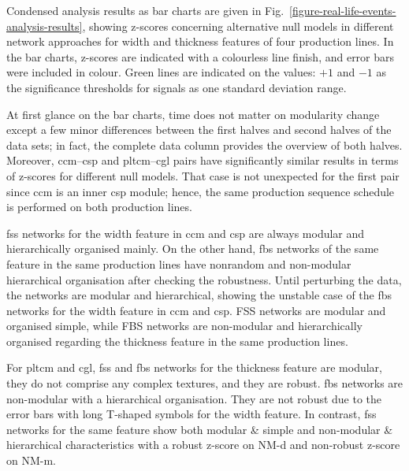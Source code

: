 Condensed analysis results as bar charts are given in Fig.~\ref{figure-real-life-events-analysis-results}, showing z-scores concerning alternative null models in different network approaches for width and thickness features of four production lines. In the bar charts, z-scores are indicated with a colourless line finish, and error bars were included in colour. Green lines are indicated on the values: $+1$ and $-1$ as the significance thresholds for signals as one standard deviation range.
\renewcommand{\aa}{Analysis Bar Chart Results:}


\newcommand{\bb}{Modularity Values and Z-scores in Different Network Resolutions}
\newcommand{\cc}{Analysis Curve Plot Results:}
\newcommand{\dd}{Modularity Values and Z-scores in Sliding-time Windows \& Different Network Resolutions}
\newcommand{\ee}{Modularity Values and Z-scores in Discrete-time Windows}

At first glance on the bar charts, time does not matter on modularity change except a few minor differences between the first halves and second halves of the data sets; in fact, the complete data column provides the overview of both halves. Moreover, \acs{ccm}--\acs{csp} and \acs{pltcm}--\acs{cgl} pairs have significantly similar results in terms of z-scores for different null models. That case is not unexpected for the first pair since \acs{ccm} is an inner \acs{csp} module; hence, the same production sequence schedule is performed on both production lines.

\acs{fss} networks for the width feature in \acs{ccm} and \acs{csp} are always modular and hierarchically organised mainly. On the other hand, \acs{fbs} networks of the same feature in the same production lines have nonrandom and non-modular hierarchical organisation after checking the robustness. Until perturbing the data, the networks are modular and hierarchical, showing the unstable case of the \acs{fbs} networks for the width feature in \acs{ccm} and \acs{csp}. FSS networks are modular and organised simple, while FBS networks are non-modular and hierarchically organised regarding the thickness feature in the same production lines. 

For \acs{pltcm} and \acs{cgl}, \acs{fss} and \acs{fbs} networks for the thickness feature are modular, they do not comprise any complex textures, and they are robust. \acs{fbs} networks are non-modular with a hierarchical organisation. They are not robust due to the error bars with long T-shaped symbols for the width feature. In contrast, \acs{fss} networks for the same feature show both modular \& simple and non-modular \& hierarchical characteristics with a robust z-score on NM-d and non-robust z-score on NM-m.

